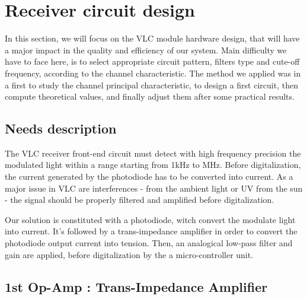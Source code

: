 \section{Receiver circuit design}

In this section, we will focus on the VLC module hardware design, that will have a major impact in the quality and efficiency of our system. Main difficulty we have to face here, is to select appropriate circuit pattern, filters type and cute-off frequency, according to the channel characteristic. The method we applied was in a first to study the channel principal characteristic, to design a first circuit, then compute theoretical values, and finally adjust them after some practical results. 

\subsection{Needs description}

The VLC receiver front-end circuit must detect with high frequency precision the modulated light within a range starting from 1kHz to MHz. Before digitalization, the current generated by the photodiode has to be converted into current.
As a major issue in VLC are interferences - from the ambient light or UV from the sun - the signal should be properly filtered and amplified before digitalization.

Our solution is constituted with a photodiode, witch convert the modulate light into current. It's followed by a trans-impedance amplifier in order to convert the photodiode output current into tension. Then, an analogical low-pass filter and gain are applied, before digitalization by the a micro-controller unit.

\subsection{1st Op-Amp : Trans-Impedance Amplifier}

